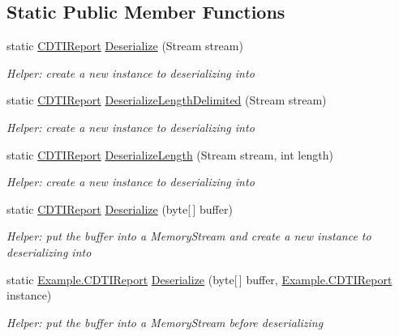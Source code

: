 \subsection*{Static Public Member Functions}
\begin{DoxyCompactItemize}
\item 
static \hyperlink{class_example_1_1_c_d_t_i_report}{C\+D\+T\+I\+Report} \hyperlink{class_example_1_1_c_d_t_i_report_ac839a59baea94b2d0d85e233f0afaf31}{Deserialize} (Stream stream)
\begin{DoxyCompactList}\small\item\em Helper\+: create a new instance to deserializing into\end{DoxyCompactList}\item 
static \hyperlink{class_example_1_1_c_d_t_i_report}{C\+D\+T\+I\+Report} \hyperlink{class_example_1_1_c_d_t_i_report_a6e790e0e071fac05495f369414a8131a}{Deserialize\+Length\+Delimited} (Stream stream)
\begin{DoxyCompactList}\small\item\em Helper\+: create a new instance to deserializing into\end{DoxyCompactList}\item 
static \hyperlink{class_example_1_1_c_d_t_i_report}{C\+D\+T\+I\+Report} \hyperlink{class_example_1_1_c_d_t_i_report_a12c67ba955b64011c831c1f9b3f64f07}{Deserialize\+Length} (Stream stream, int length)
\begin{DoxyCompactList}\small\item\em Helper\+: create a new instance to deserializing into\end{DoxyCompactList}\item 
static \hyperlink{class_example_1_1_c_d_t_i_report}{C\+D\+T\+I\+Report} \hyperlink{class_example_1_1_c_d_t_i_report_a7ef6d83b62dd2beac045403f6e1a8054}{Deserialize} (byte\mbox{[}$\,$\mbox{]} buffer)
\begin{DoxyCompactList}\small\item\em Helper\+: put the buffer into a Memory\+Stream and create a new instance to deserializing into\end{DoxyCompactList}\item 
static \hyperlink{class_example_1_1_c_d_t_i_report}{Example.\+C\+D\+T\+I\+Report} \hyperlink{class_example_1_1_c_d_t_i_report_a858fd88fb0a1f98ee24f1ddd1d43e3e0}{Deserialize} (byte\mbox{[}$\,$\mbox{]} buffer, \hyperlink{class_example_1_1_c_d_t_i_report}{Example.\+C\+D\+T\+I\+Report} instance)
\begin{DoxyCompactList}\small\item\em Helper\+: put the buffer into a Memory\+Stream before deserializing\end{DoxyCompactList}\item 

\end{DoxyCompactItemize}
